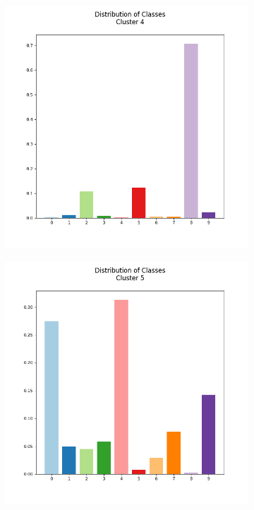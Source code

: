\documentclass[12pt, a4paper]{article}
\begin{document}
\begin{figure}[h]
\begin{subfigure}{0.3\linewidth}
    \end{subfigure}
    \hfill
    \begin{subfigure}{0.3\linewidth}
        \centering
        \includegraphics[scale=0.15]{images/q4/g/cluster4.png}
    \end{subfigure}
    \hfill
    \begin{subfigure}{0.3\linewidth}
        \centering
        \includegraphics[scale=0.15]{images/q4/g/cluster5.png}

\end{subfigure}
\end{figure}
\end{document}
